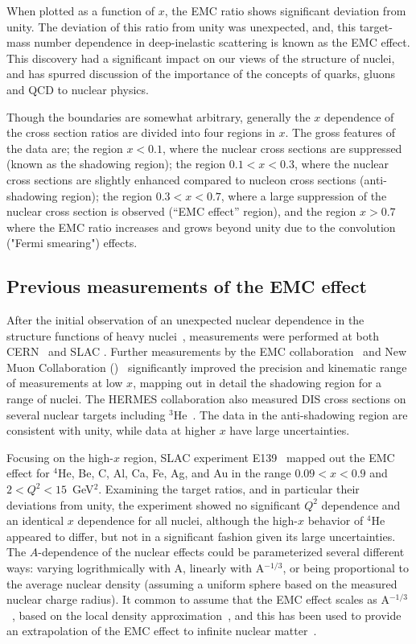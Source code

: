 When plotted as a function of $x$, the EMC ratio shows significant deviation
from unity. The deviation of this ratio from unity was unexpected, and, this
target-mass number dependence in deep-inelastic scattering is known as the
EMC effect. This discovery had a significant impact on our views of the
structure of nuclei, and has spurred discussion of the importance of the
concepts of quarks, gluons and QCD to nuclear physics.


Though the boundaries are somewhat arbitrary, generally the $x$ dependence of
the cross section ratios are divided into four regions in $x$. The gross
features of the data are; the region $x<0.1$, where the nuclear cross sections
are suppressed (known as the shadowing region); the region $0.1<x<0.3$, where
the nuclear cross sections are slightly enhanced compared to nucleon cross
sections (anti-shadowing region); the region $0.3<x<0.7$, where a large
suppression of the nuclear cross section is observed (``EMC effect'' region),
and the region $x>0.7$ where the EMC ratio increases and grows beyond unity
due to the convolution ("Fermi smearing") effects.


\subsection{Previous measurements of the EMC effect}\label{prevexpt.ssec}

After the initial observation of an unexpected nuclear dependence in the
structure functions of heavy nuclei~\cite{aubert83}, measurements were
performed at both CERN~\cite{cern_na2prime1, cern_na2prime2, cern_bcdms1} and
SLAC \cite{slace49b,slace61,slace87,slace139}. Further measurements by the EMC
collaboration~\cite{aubert86} and New Muon Collaboration
()~\cite{Arneodo:1995cs,Amaudruz:1995tq} significantly improved the
precision and kinematic range of measurements at low $x$, mapping out in
detail the shadowing region for a range of nuclei. The HERMES collaboration
also measured DIS cross sections on several nuclear targets including
$^3$He~\cite{hermes_ackerstaff,hermes_correction_airapetian}. The data
in the anti-shadowing region are consistent with unity, while data at
higher $x$ have large uncertainties.

Focusing on the high-$x$ region, SLAC experiment E139~\cite{slace139}
mapped out the EMC effect for $^4$He, Be, C, Al, Ca, Fe,
Ag, and Au in the range $0.09<x<0.9$ and $2<Q^2<15$~GeV$^2$. Examining
the target ratios, and in particular their deviations from unity,
the experiment showed no significant $Q^2$ dependence and an identical $x$
dependence for all nuclei, although the high-$x$ behavior of $^4$He appeared
to differ, but not in a significant fashion given its large uncertainties.
The $A$-dependence of the nuclear effects could be parameterized several
different ways: varying logrithmically with A, linearly with A$^{-1/3}$,
or being proportional to the average nuclear density (assuming a uniform
sphere based on the measured nuclear charge radius). It common to assume that
the EMC effect scales as A$^{-1/3}$~\cite{arrington12c}, based on the local
density approximation~\cite{antonov86}, and this has been used to provide an
extrapolation of the EMC effect to infinite nuclear matter~\cite{sick92}.


